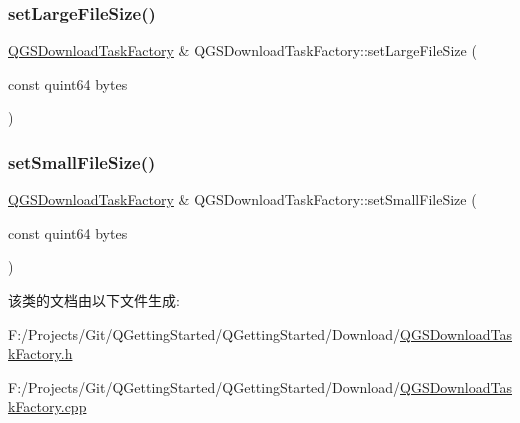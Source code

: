 \subsubsection{\texorpdfstring{set\+Large\+File\+Size()}{setLargeFileSize()}}
{\footnotesize\ttfamily \mbox{\hyperlink{class_q_g_s_download_task_factory}{Q\+G\+S\+Download\+Task\+Factory}} \& Q\+G\+S\+Download\+Task\+Factory\+::set\+Large\+File\+Size (\begin{DoxyParamCaption}\item[{const quint64}]{bytes }\end{DoxyParamCaption})}

\mbox{\label{class_q_g_s_download_task_factory_abf94d693d3bb16676997f3e0c5a978d0}} 
\subsubsection{\texorpdfstring{set\+Small\+File\+Size()}{setSmallFileSize()}}
{\footnotesize\ttfamily \mbox{\hyperlink{class_q_g_s_download_task_factory}{Q\+G\+S\+Download\+Task\+Factory}} \& Q\+G\+S\+Download\+Task\+Factory\+::set\+Small\+File\+Size (\begin{DoxyParamCaption}\item[{const quint64}]{bytes }\end{DoxyParamCaption})}



该类的文档由以下文件生成\+:\begin{DoxyCompactItemize}
\item 
F\+:/\+Projects/\+Git/\+Q\+Getting\+Started/\+Q\+Getting\+Started/\+Download/\mbox{\hyperlink{_q_g_s_download_task_factory_8h}{Q\+G\+S\+Download\+Task\+Factory.\+h}}\item 
F\+:/\+Projects/\+Git/\+Q\+Getting\+Started/\+Q\+Getting\+Started/\+Download/\mbox{\hyperlink{_q_g_s_download_task_factory_8cpp}{Q\+G\+S\+Download\+Task\+Factory.\+cpp}}\end{DoxyCompactItemize}
